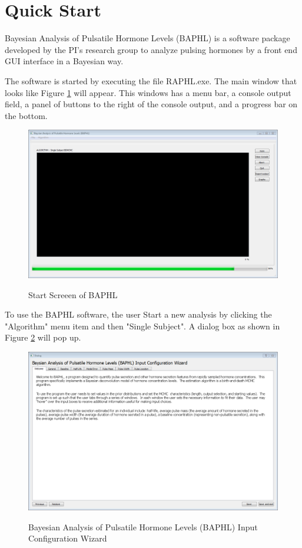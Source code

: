 \documentclass[11pt]{book}
\begin{document}
\section{Quick Start}
Bayesian Analysis of Pulsatile Hormone Levels (BAPHL) is a software package developed by the PI's research group to analyze pulsing hormones by a front end GUI interface in a Bayesian way.


The software is started by executing the file RAPHL.exe.  The main window that looks like Figure \ref{startscreen} will appear.  This windows has a menu bar, a console output field, a panel of buttons to the right of the console output, and a progress bar on the bottom.
\begin{figure}
  \centering
  \includegraphics[width=\textwidth]{start.PNG}\\
  \caption{Start Screeen of BAPHL}\label{startscreen}
\end{figure}
To use the BAPHL software, the user
Start a new analysis by clicking the "Algorithm" menu item and then "Single Subject".  A dialog box as shown in Figure \ref{singlesubject} will pop up.
\begin{figure}
  \centering
  \includegraphics[width=\textwidth]{singlesubject.PNG}\\
  \caption{Bayesian Analysis of Pulsatile Hormone Levels (BAPHL) Input Configuration Wizard}\label{singlesubject}
\end{figure}
\end{document}

